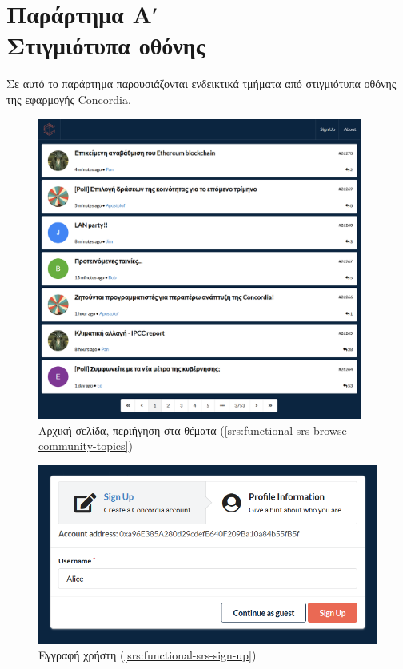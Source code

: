 \chapter*{Παράρτημα Αʹ\\[20pt]Στιγμιότυπα οθόνης}\label{appendix-a}


\captionsetup{labelformat=AppendixAFigures}
\setcounter{figure}{0}

Σε αυτό το παράρτημα παρουσιάζονται ενδεικτικά τμήματα από στιγμιότυπα οθόνης της εφαρμογής Concordia.

\begin{figure}[H]
	\centering
	\includegraphics[width=0.95\textwidth]{assets/figures/appendix-a/screenshot-1-topics-screen}
	\caption{Αρχική σελίδα, περιήγηση στα θέματα (\ref{srs:functional-srs-browse-community-topics})}
\end{figure}

\begin{figure}[H]
	\centering
	\includegraphics[width=.9\textwidth]{assets/figures/appendix-a/screenshot-2-signup}
	\caption{Εγγραφή χρήστη (\ref{srs:functional-srs-sign-up})}
\end{figure}

